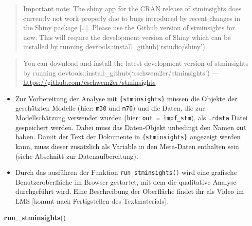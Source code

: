 \documentclass[
]{book}
\newenvironment{Shaded}{\begin{snugshade}}{\end{snugshade}}
\newcommand{\KeywordTok}[1]{\textcolor[rgb]{0.13,0.29,0.53}{\textbf{#1}}}
\newcommand{\NormalTok}[1]{#1}
\providecommand{\tightlist}{%
  \setlength{\itemsep}{0pt}\setlength{\parskip}{0pt}}
\begin{document}
\begin{quote}
Important note: The shiny app for the CRAN release of stminsights does currently not work properly due to bugs introduced by recent changes in the Shiny package {[}\ldots{]}. Please use the Github version of stminsights for now. This will require the development version of Shiny which can be installed by running devtools::install\_github(`rstudio/shiny').
\end{quote}

\begin{quote}
You can download and install the latest development version of stminsights by running devtools::install\_github(`cschwem2er/stminsights') --- \url{https://github.com/cschwem2er/stminsights}
\end{quote}

\begin{itemize}
\tightlist
\item
  Zur Vorbereitung der Analyse mit \texttt{\{stminsights\}} müssen die Objekte der geschätzten Modelle (hier: \texttt{m30} und \texttt{m70}) und die Daten, die zur Modellschätzung verwendet wurden (hier: \texttt{out\ =\ ìmpf\_stm}), als \texttt{.rdata} Datei gespeichert werden. Dabei muss das Daten-Objekt unbedingt den Namen \texttt{out} haben. Damit der Text der Dokumente in \texttt{\{stminsights\}} angezeigt werden kann, muss dieser zusätzlich als Variable in den Meta-Daten enthalten sein (siehe Abschnitt zur Datenaufbereitung).
\item
  Durch das ausführen der Funktion \texttt{run\_stminsights()} wird eine grafische Benutzeroberfläche im Browser gestartet, mit dem die qualitative Analyse durchgeführt wird. Eine Beschreibung der Oberfläche findet ihr als Video im LMS {[}kommt nach Fertigstellen des Textmaterials{]}.
\end{itemize}

\begin{Shaded}
\begin{Highlighting}[]
\KeywordTok{run_stminsights}\NormalTok{()}
\end{Highlighting}
\end{Shaded}
\end{document}
